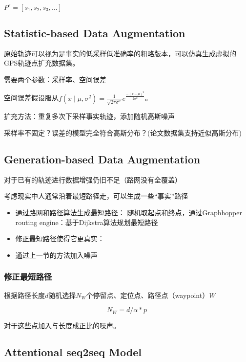 \begin{definition}[基于路段的轨迹]
    $ P^{s}=\left[s_{1}, s_{2}, s_{3}, \ldots\right] $
\end{definition}

\subsection{Statistic-based Data Augmentation}

原始轨迹可以视为是事实的低采样低准确率的粗略版本，可以仿真生成虚拟的GPS轨迹点扩充数据集。

需要两个参数：采样率、空间误差

空间误差假设服从$ f\left(x \mid \mu, \sigma^{2}\right)=\frac{1}{\sqrt{2 \pi \sigma^{2}}} e^{\frac{-(x-\mu)^{2}}{2 \sigma^{2}}} $。

扩充方法：重复多次下采样事实轨迹，添加随机高斯噪声

\begin{remark}
    采样率不固定？误差的模型完全符合高斯分布？(论文数据集支持近似高斯分布)
\end{remark}

\subsection{Generation-based Data Augmentation}

对于已有的轨迹进行数据增强仍旧不足（路网没有全覆盖）

考虑现实中人通常沿着最短路径走，可以生成一些“事实”路径

\begin{itemize}
    \item 通过路网和路径算法生成最短路径： 随机取起点和终点，通过Graphhopper routing engine：基于Dijkstra算法规划最短路径
    \item 修正最短路径使得它更真实：
    \item 通过上一节的方法加入噪声
\end{itemize}

\subsubsection{修正最短路径}

根据路径长度$d$随机选择$N_W$个停留点、定位点、路径点（waypoint）$W$

$$ N_{W}=d / \alpha * p $$

对于这些点加入与长度成正比的噪声。

\subsection{Attentional seq2seq Model}

